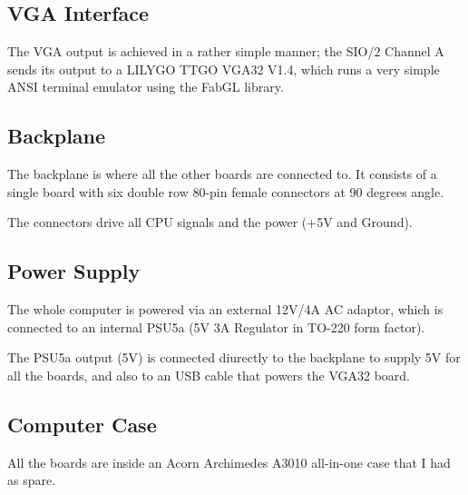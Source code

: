 \documentclass[a4paper,11pt]{article}
\begin{document}
    \subsection{VGA Interface}

    The VGA output is achieved in a rather simple manner; the SIO/2 Channel A
    sends its output to a LILYGO TTGO VGA32 V1.4, which runs a very simple ANSI
    terminal emulator using the FabGL library.


    \subsection{Backplane}

    The backplane is where all the other boards are connected to. It consists
    of a single board with six double row 80-pin female connectors at 90 degrees
    angle.

    The connectors drive all CPU signals and the power (+5V and Ground).

    \subsection{Power Supply}

    The whole computer is powered via an external 12V/4A AC adaptor, which is 
    connected to an internal PSU5a (5V 3A Regulator in TO-220 form factor).

    The PSU5a output (5V) is connected diurectly to the backplane to supply 5V
    for all the boards, and also to an USB cable that powers the VGA32 board.

    \subsection{Computer Case}

    All the boards are inside an Acorn Archimedes A3010 all-in-one case that I
    had as spare.
\end{document}
